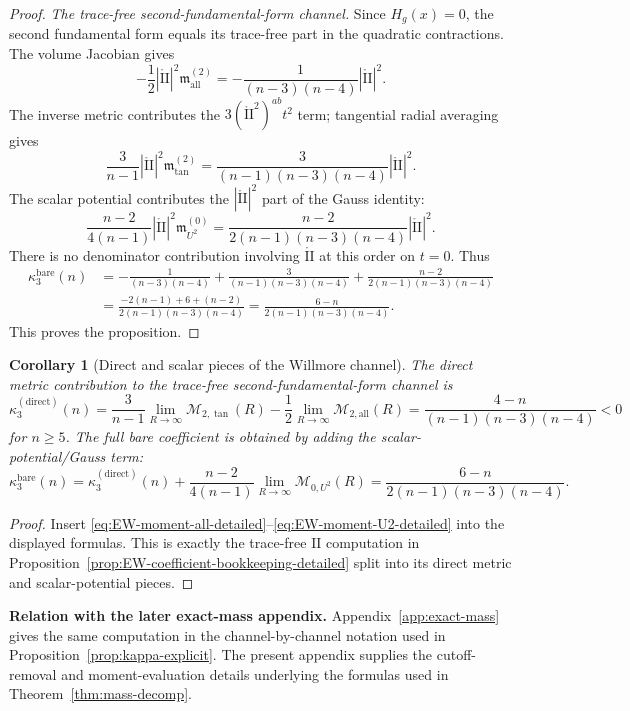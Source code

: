 \documentclass[11pt,reqno,a4paper]{amsart}
\numberwithin{equation}{section}
\theoremstyle{plain}
\newtheorem{corollary}[theorem]{Corollary}
\theoremstyle{remark}
\theoremstyle{plain}
\begin{document}
\begin{proof}
\smallskip
\noindent\emph{The trace-free second-fundamental-form channel.}
Since $H_g(x)=0$, the second fundamental form equals its trace-free part in the
quadratic contractions.  The volume Jacobian gives
\[
-\frac12|\mathring{\mathrm{II}}|^2\mathfrak m_{\mathrm{all}}^{(2)}
=-\frac{1}{(n-3)(n-4)}|\mathring{\mathrm{II}}|^2.
\]
The inverse metric contributes the $3(\mathring{\mathrm{II}}^2)^{ab}t^2$ term;
tangential radial averaging gives
\[
\frac{3}{n-1}|\mathring{\mathrm{II}}|^2\mathfrak m_{\tan}^{(2)}
=\frac{3}{(n-1)(n-3)(n-4)}|\mathring{\mathrm{II}}|^2.
\]
The scalar potential contributes the $|\mathring{\mathrm{II}}|^2$ part of the
Gauss identity:
\[
\frac{n-2}{4(n-1)}|\mathring{\mathrm{II}}|^2\mathfrak m_{U^2}^{(0)}
=\frac{n-2}{2(n-1)(n-3)(n-4)}|\mathring{\mathrm{II}}|^2.
\]
There is no denominator contribution involving $\mathring{\mathrm{II}}$ at this
order on $t=0$.  Thus
\begin{align*}
\kappa_3^{\mathrm{bare}}(n)
&=-\frac{1}{(n-3)(n-4)}
+\frac{3}{(n-1)(n-3)(n-4)}
+\frac{n-2}{2(n-1)(n-3)(n-4)}\\
&=\frac{-2(n-1)+6+(n-2)}{2(n-1)(n-3)(n-4)}
=\frac{6-n}{2(n-1)(n-3)(n-4)}.
\end{align*}
This proves the proposition.
\end{proof}

\begin{corollary}[Direct and scalar pieces of the Willmore channel]
\label{cor:EW-direct-scalar-pieces-detailed}
The direct metric contribution to the trace-free second-fundamental-form channel is
\[
\kappa_3^{\mathrm{(direct)}}(n)
=\frac{3}{n-1}\lim_{R\to\infty}\mathcal M_{2,\tan}(R)
-\frac12\lim_{R\to\infty}\mathcal M_{2,\mathrm{all}}(R)
=\frac{4-n}{(n-1)(n-3)(n-4)}<0
\]
for $n\ge5$.  The full bare coefficient is obtained by adding the scalar-potential/Gauss term:
\[
\kappa_3^{\mathrm{bare}}(n)
=\kappa_3^{\mathrm{(direct)}}(n)
+\frac{n-2}{4(n-1)}\lim_{R\to\infty}\mathcal M_{0,U^2}(R)
=\frac{6-n}{2(n-1)(n-3)(n-4)}.
\]
\end{corollary}

\begin{proof}
Insert \eqref{eq:EW-moment-all-detailed}--\eqref{eq:EW-moment-U2-detailed} into the displayed
formulas.  This is exactly the trace-free $\mathrm{II}$ computation in
Proposition~\ref{prop:EW-coefficient-bookkeeping-detailed} split into its direct metric and
scalar-potential pieces.
\end{proof}

\medskip
\noindent\textbf{Relation with the later exact-mass appendix.}
Appendix~\ref{app:exact-mass} gives the same computation in the channel-by-channel notation used
in Proposition~\ref{prop:kappa-explicit}.  The present appendix supplies the cutoff-removal and
moment-evaluation details underlying the formulas used in Theorem~\ref{thm:mass-decomp}.
\end{document}
